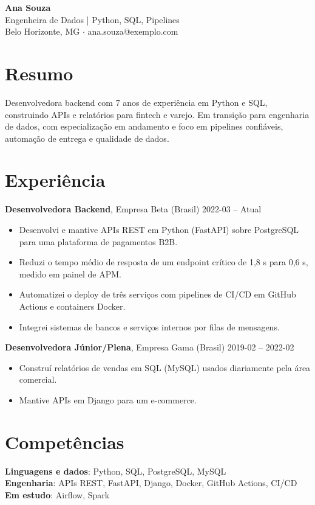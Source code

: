 \documentclass[10pt,a4paper]{article}
\begin{document}
{\LARGE\bfseries Ana Souza}\\[2pt]
{\large Engenheira de Dados | Python, SQL, Pipelines}\\[2pt]
Belo Horizonte, MG $\cdot$ ana.souza@exemplo.com

\section*{Resumo}

Desenvolvedora backend com 7 anos de experiência em Python e SQL, construindo APIs e relatórios para fintech e varejo. Em transição para engenharia de dados, com especialização em andamento e foco em pipelines confiáveis, automação de entrega e qualidade de dados.

\section*{Experiência}

\textbf{Desenvolvedora Backend}, Empresa Beta (Brasil) \hfill 2022-03 -- Atual\\
\begin{itemize}
  \item Desenvolvi e mantive APIs REST em Python (FastAPI) sobre PostgreSQL para uma plataforma de pagamentos B2B.
  \item Reduzi o tempo médio de resposta de um endpoint crítico de 1,8 s para 0,6 s, medido em painel de APM.
  \item Automatizei o deploy de três serviços com pipelines de CI/CD em GitHub Actions e containers Docker.
  \item Integrei sistemas de bancos e serviços internos por filas de mensagens.
\end{itemize}
\textbf{Desenvolvedora Júnior/Plena}, Empresa Gama (Brasil) \hfill 2019-02 -- 2022-02\\
\begin{itemize}
  \item Construí relatórios de vendas em SQL (MySQL) usados diariamente pela área comercial.
  \item Mantive APIs em Django para um e-commerce.
\end{itemize}

\section*{Competências}

\textbf{Linguagens e dados}: Python, SQL, PostgreSQL, MySQL\\
\textbf{Engenharia}: APIs REST, FastAPI, Django, Docker, GitHub Actions, CI/CD\\
\textbf{Em estudo}: Airflow, Spark\\
\end{document}
